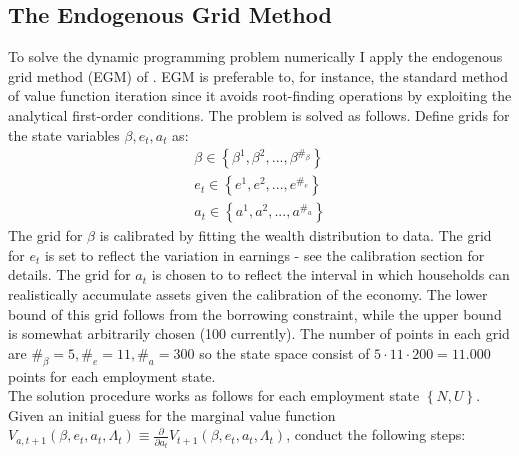 \subsection{The Endogenous Grid Method}  \label{HH_problem_numerical_sol}
To solve the dynamic programming problem numerically I apply the endogenous grid method (EGM) of \citet{carroll2006method}. EGM is preferable to, for instance, the standard method of value function iteration since it avoids root-finding operations by exploiting the analytical first-order conditions. The problem is solved as follows. Define grids for the state variables $\beta,e_{t},a_{t}$ as:
\begin{gather*}
\beta\in\left\{ \beta^{1},\beta^{2},...,\beta^{\#_{\beta}}\right\}  \\
e_{t}\in\left\{ e^{1},e^{2},...,e^{\#_{e}}\right\}  \\
a_{t}\in\left\{ a^{1},a^{2},...,a^{\#_{a}}\right\} 
\end{gather*}
The grid for $\beta$ is calibrated by fitting the wealth distribution to data. The grid for $e_t$ is set to reflect the variation in earnings - see the calibration section for details. The grid for $a_t$ is chosen to to reflect the interval in which households can realistically accumulate assets given the calibration of the economy. The lower bound of this grid follows from the borrowing constraint, while the upper bound is somewhat arbitrarily chosen (100 currently). The number of points in each grid are $\#_{\beta}=5,\#_{e}=11,\#_{a}=300$ so the state space consist of $5\cdot11\cdot200=11.000$ points for each employment state.   \\
The solution procedure works as follows for each employment state $\left\{ N,U\right\}$. Given an initial guess for the marginal value function $V_{a,t+1}\left(\beta,e_{t},a_{t},\Lambda_{t}\right)\equiv\frac{\partial}{\partial a_{t}}V_{t+1}\left(\beta,e_{t},a_{t},\Lambda_{t}\right)$, conduct the following steps:
